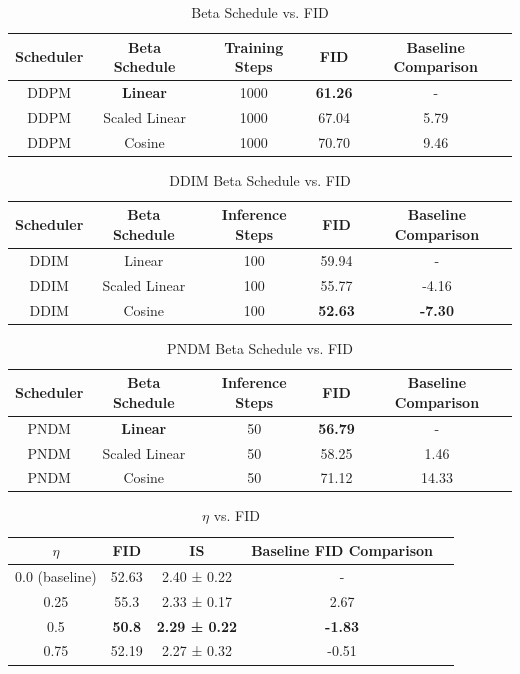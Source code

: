 \documentclass[conference]{IEEEtran}
\begin{document}
\begin{table}[H]
    \centering
    \caption{Beta Schedule vs. FID}
    \label{tab:scheduler_table2}
    \begin{tabular}{ccccc}
    \hline
        Scheduler & Beta Schedule & Training Steps & FID & Baseline Comparison \\
        \hline
        \hline
        DDPM & \textbf{Linear} & 1000 & \textbf{61.26} & - \\
        \hline
        DDPM & Scaled Linear & 1000 & 67.04 & 5.79 \\ 
        DDPM & Cosine & 1000 & 70.70 & 9.46 \\ \hline
    \end{tabular}
\end{table}

\begin{table}[H]
    \centering
    \caption{DDIM Beta Schedule vs. FID}
    \label{tab:scheduler_table3}
    \begin{tabular}{ccccc}
    \hline
        Scheduler & Beta Schedule & Inference Steps & FID & Baseline Comparison \\ \hline
        \hline
        DDIM & Linear & 100 & 59.94 & - \\ 
        \hline
        DDIM & Scaled Linear & 100 & 55.77 & -4.16 \\ 
        DDIM & Cosine & 100 & \textbf{52.63} & \textbf{-7.30} \\ \hline
    \end{tabular}
\end{table}

\begin{table}[H]
    \centering
    \caption{PNDM Beta Schedule vs. FID}
    \label{tab:scheduler_table4}
    \begin{tabular}{ccccc}
    \hline
        Scheduler & Beta Schedule & Inference Steps & FID & Baseline Comparison \\
        \hline   
        \hline
        PNDM & \textbf{Linear} & 50 & \textbf{56.79} & - \\
        \hline
        PNDM & Scaled Linear & 50 & 58.25 & 1.46 \\ 
        PNDM & Cosine & 50 & 71.12 & 14.33 \\ \hline
    \end{tabular}
\end{table}

\begin{table}[H]
    \centering
    \caption{$\eta$ vs. FID}
    \label{tab:scheduler_table5}
    \begin{tabular}{ccccc}
    \hline
        $\eta$ & FID & IS & Baseline FID Comparison \\
        \hline   
        \hline
        0.0 (baseline) & 52.63 & 2.40 ± 0.22 & - \\
        \hline
        0.25 & 55.3 & 2.33 ± 0.17 & 2.67 \\ 
        0.5 & \textbf{50.8} & \textbf{2.29 ± 0.22} & \textbf{-1.83} \\ 
        0.75 & 52.19 & 2.27 ± 0.32 & -0.51 \\ \hline
    \end{tabular}
\end{table}
\end{document}

